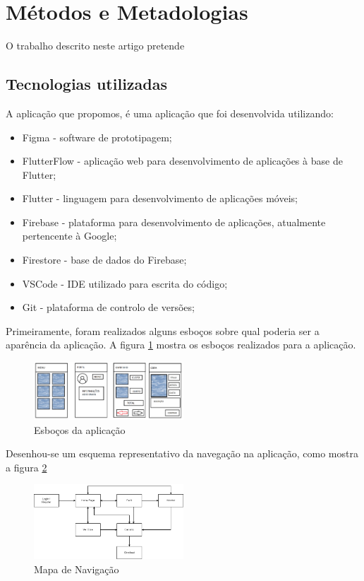 \documentclass[conference]{IEEEtran}
\begin{document}
\section{Métodos e Metadologias}

O trabalho descrito neste artigo pretende 

\subsection{Tecnologias utilizadas}

A aplicação que propomos, é uma aplicação que foi desenvolvida utilizando:

\begin{itemize}
    \item Figma - software de prototipagem;
    \item FlutterFlow - aplicação web para desenvolvimento de aplicações à base de Flutter;
    \item Flutter - linguagem para desenvolvimento de aplicações móveis;
    \item Firebase - plataforma para desenvolvimento de aplicações, atualmente pertencente à Google;
    \item Firestore - base de dados do Firebase;
    \item VSCode - IDE utilizado para escrita do código;
    \item Git - plataforma de controlo de versões;
\end{itemize}

Primeiramente, foram realizados alguns esboços sobre qual poderia ser a aparência da aplicação. A figura \ref{fig:sketches} 
mostra os esboços realizados para a aplicação.

\begin{figure}[ht]
    \centering
    \includegraphics[width=0.5\textwidth]{appsketches.png}
    \caption{Esboços da aplicação}
    \label{fig:sketches}
\end{figure}

Desenhou-se um esquema representativo da navegação na aplicação, como mostra a figura \ref{fig:navmap}

\begin{figure}[ht]
    \centering
    \includegraphics[width=0.5\textwidth]{artstore+map.drawio.png}
    \caption{Mapa de Navigação}
    \label{fig:navmap}
\end{figure}
\end{document}
